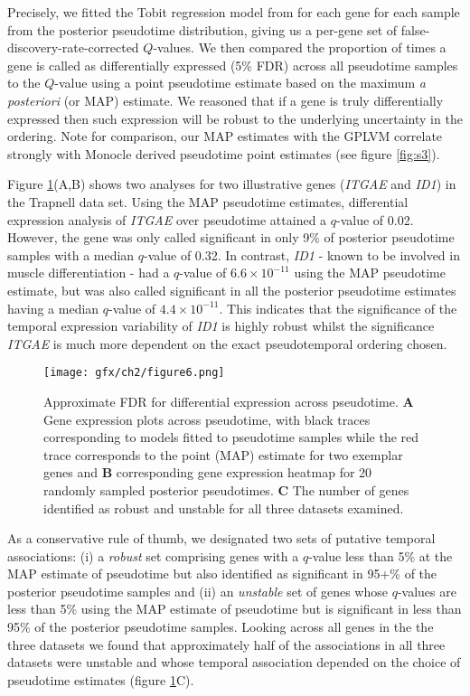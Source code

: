 Precisely, we fitted the Tobit regression model from \cite{Trapnell2014-xi} for each gene for each sample from the posterior pseudotime distribution, giving us a per-gene set of false-discovery-rate-corrected $Q$-values. We then compared the proportion of times a gene is called as differentially expressed (5\% FDR) across all pseudotime samples to the $Q$-value using a point pseudotime estimate based on the maximum \textit{a posteriori} (or MAP) estimate. We reasoned that if a gene is truly differentially expressed then such expression will be robust to the underlying uncertainty in the ordering. Note for comparison, our MAP estimates with the GPLVM correlate strongly with Monocle derived pseudotime point estimates (see figure \ref{fig:s3}).

Figure \ref{fig:afdr}(A,B) shows two analyses for two illustrative genes  (\emph{ITGAE} and \emph{ID1}) in the Trapnell data set. Using the MAP pseudotime estimates, differential expression analysis of \emph{ITGAE} over pseudotime attained a $q$-value of 0.02. However, the gene was only called significant in only 9\% of posterior pseudotime samples with a median $q$-value of 0.32. In contrast, \emph{ID1} - known to be involved in muscle differentiation - had a $q$-value of $6.6 \times 10^{-11}$ using the MAP pseudotime estimate, but was also called  significant in all the posterior pseudotime estimates having a median $q$-value of $4.4 \times 10^{-11}$. This indicates that the significance of the temporal expression variability of \emph{ID1} is highly robust whilst the significance \emph{ITGAE} is much more dependent on the exact pseudotemporal ordering chosen.

\begin{figure}
	\centering
	\texttt{[image: gfx/ch2/figure6.png]}
\caption{ Approximate FDR for differential expression across pseudotime.
\textbf{A} Gene expression plots across pseudotime, with black traces corresponding to models fitted to pseudotime samples while the red trace corresponds to the point (MAP) estimate for two exemplar genes and \textbf{B} corresponding gene expression heatmap for 20 randomly sampled posterior pseudotimes.
\textbf{C} The number of genes identified as robust and unstable for all three datasets examined.}
\label{fig:afdr}
\end{figure}

As a conservative rule of thumb, we designated two sets of putative temporal associations: (i) a \emph{robust} set comprising genes with a $q$-value less than 5\% at the MAP estimate of pseudotime but also identified as significant in 95+\% of the posterior pseudotime samples and (ii) an \emph{unstable} set of genes whose $q$-values are less than 5\% using the MAP estimate of pseudotime but is significant in less than 95\% of the posterior pseudotime samples. Looking across all genes in the the three datasets we found that approximately half of the associations in all three datasets were unstable and whose temporal association depended on the choice of pseudotime estimates (figure \ref{fig:afdr}C).

